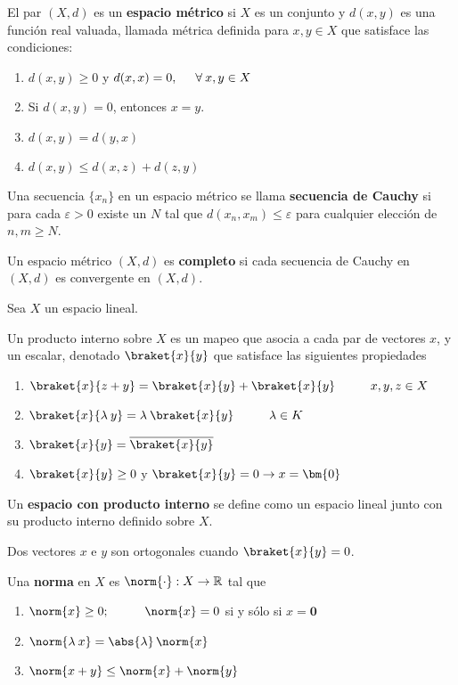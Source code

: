 \begin{defi}
El par $(X, d)$ es un \textbf{espacio métrico} si $X$ es un conjunto y $d(x, y)$ es una función real valuada, llamada métrica definida para $x, y \in X$ que satisface las condiciones:
\begin{enumerate}
\item $d(x, y) \geq 0$ y $d(x, x) = 0, \hspace{0.5cm} \forall \: x, y \in X$
\item  Si $d(x, y) = 0$, entonces $x = y$.
\item $d(x, y) = d(y, x)$
\item $d(x, y) \leq d(x, z) + d(z, y)$
\end{enumerate}
\end{defi}
Una secuencia $\{x_{n}\}$ en un espacio métrico se llama \textbf{secuencia de Cauchy} si para cada $\varepsilon > 0$ existe un $N$ tal que $d(x_{n}, x_{m}) \leq \varepsilon$ para cualquier elección de $n, m \geq N$.
\par
Un espacio métrico $(X , d)$ es \textbf{completo} si cada secuencia de Cauchy en $(X , d)$ es convergente en $(X , d)$.
\begin{defi}Sea $X$ un espacio lineal.
    
Un producto interno sobre $X$ es un mapeo que asocia a cada par de vectores $x$, y un escalar, denotado $ \braket{x}{y}$ que satisface las siguientes propiedades
\begin{enumerate}[label=\roman*.]
\item $\braket{x}{z + y} = \braket{x}{y} + \braket{x}{y} \hspace{1cm} x, y, z \in X$
\item $\braket{x}{\lambda \: y} = \lambda \: \braket{x}{y} \hspace{1cm} \lambda \in K$
\item $\braket{x}{y} = \overline{\braket{x}{y}}$
\item $\braket{x}{y} \geq 0$ y $\braket{x}{y} = 0 \rightarrow x = \bm{0} $ 
\end{enumerate}
\end{defi}
Un \textbf{espacio con producto interno} se define como un espacio lineal junto con su producto interno definido sobre $X$.
\begin{defi}
Dos vectores $x$ e $y$ son ortogonales cuando $\braket{x}{y} = 0$.
\end{defi}
\begin{defi}
Una \textbf{norma} en $X$ es $\norm{\cdot} : X \rightarrow \mathbb{R}$ tal que  
\begin{enumerate}[label=\roman*.]
\item $\norm{x} \geq 0; \hspace{1cm} \norm{x} = 0$ si y sólo si $x = \bm{0}$
\item $\norm{\lambda \: x} =  \abs{\lambda} \, \norm{x}$
\item $\norm{x + y} \leq \norm{x} + \norm{y}$
\end{enumerate}
\end{defi}
